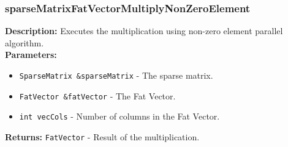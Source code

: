 \documentclass[12pt,oneside]{book} %
\begin{document}
\begin{subappendices}
    \subsubsection{sparseMatrixFatVectorMultiplyNonZeroElement}
    \textbf{Description:} Executes the multiplication using non-zero element parallel algorithm.\\

    \textbf{Parameters:}
    \begin{itemize}
        \item \texttt{SparseMatrix \&sparseMatrix} - The sparse matrix.
        \item \texttt{FatVector \&fatVector} - The Fat Vector.
        \item \texttt{int vecCols} - Number of columns in the Fat Vector.
    \end{itemize}

    \textbf{Returns:} \texttt{FatVector} - Result of the multiplication.

\end{subappendices}
\end{document}
